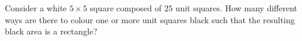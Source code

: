 Consider a white $5 \times 5$ square composed of $25$ unit squares.
How many different ways are there to colour one or more unit squares black such that
the resulting black area is a rectangle?
